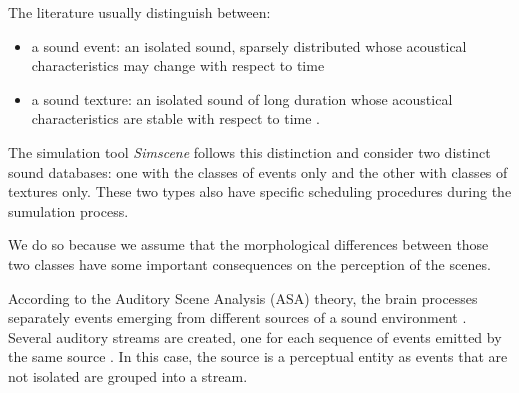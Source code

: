 \documentclass[twoside,twocolumn]{article}
\begin{document}
The literature usually distinguish between:
\begin{itemize}
\item {a sound event}: an isolated sound, sparsely distributed whose acoustical characteristics may change with respect to time
\item {a sound texture}: an isolated sound of long duration whose acoustical characteristics are stable with respect to time \cite{saint1995classification}.
\end{itemize}

The simulation tool \emph{Simscene} follows this distinction and consider two distinct sound databases: one with the classes of events only and the other with classes of textures only. These two types also have specific scheduling procedures during the sumulation process.



We do so because we assume that the morphological differences between those two classes have some important consequences on the perception of the scenes.


According to the Auditory Scene Analysis (ASA) theory, the brain processes separately events emerging from different sources of a sound environment \cite{bregman1994auditory}. Several auditory streams are created, one for each sequence of events emitted by the same source \cite{carlyon2004brain}. In this case, the source is a perceptual entity as events that are not isolated are grouped into a stream.

\end{document}
